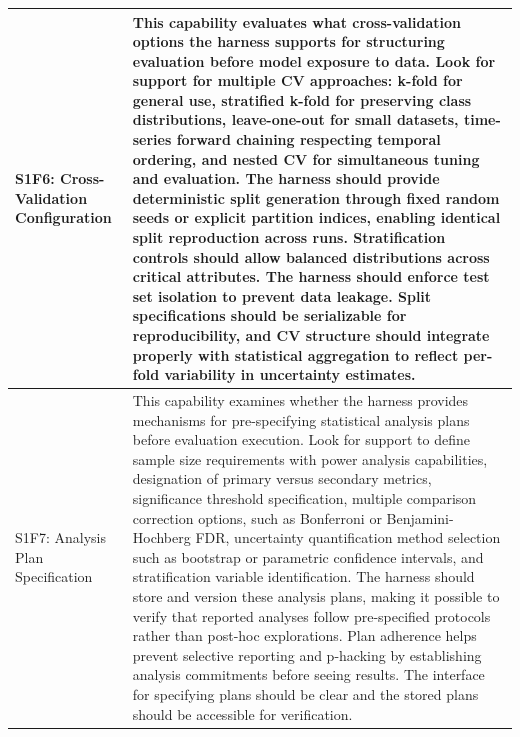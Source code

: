 \begin{longtable}{>{\raggedright\arraybackslash}p{3cm}|>{\raggedright\arraybackslash}p{16cm}}
S1F6: Cross-Validation Configuration & This capability evaluates what cross-validation options the harness supports for structuring evaluation before model exposure to data. Look for support for multiple CV approaches: k-fold for general use, stratified k-fold for preserving class distributions, leave-one-out for small datasets, time-series forward chaining respecting temporal ordering, and nested CV for simultaneous tuning and evaluation. The harness should provide deterministic split generation through fixed random seeds or explicit partition indices, enabling identical split reproduction across runs. Stratification controls should allow balanced distributions across critical attributes. The harness should enforce test set isolation to prevent data leakage. Split specifications should be serializable for reproducibility, and CV structure should integrate properly with statistical aggregation to reflect per-fold variability in uncertainty estimates. \\
\hline

S1F7: Analysis Plan Specification & This capability examines whether the harness provides mechanisms for pre-specifying statistical analysis plans before evaluation execution. Look for support to define sample size requirements with power analysis capabilities, designation of primary versus secondary metrics, significance threshold specification, multiple comparison correction options, such as Bonferroni or Benjamini-Hochberg FDR, uncertainty quantification method selection such as bootstrap or parametric confidence intervals, and stratification variable identification. The harness should store and version these analysis plans, making it possible to verify that reported analyses follow pre-specified protocols rather than post-hoc explorations. Plan adherence helps prevent selective reporting and p-hacking by establishing analysis commitments before seeing results. The interface for specifying plans should be clear and the stored plans should be accessible for verification. \\
\hline


\end{longtable}
